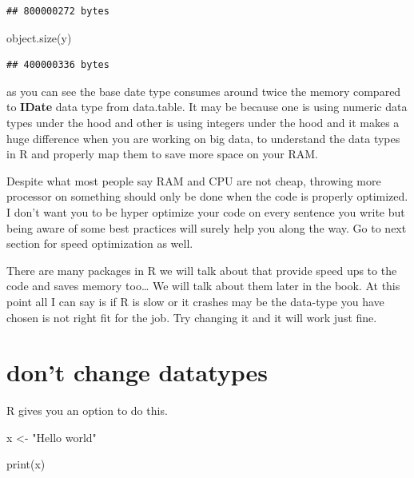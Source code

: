 \documentclass[
]{book}
\newenvironment{Shaded}{\begin{snugshade}}{\end{snugshade}}
\newcommand{\FunctionTok}[1]{\textcolor[rgb]{0.00,0.00,0.00}{#1}}
\newcommand{\NormalTok}[1]{#1}
\newcommand{\OtherTok}[1]{\textcolor[rgb]{0.56,0.35,0.01}{#1}}
\newcommand{\StringTok}[1]{\textcolor[rgb]{0.31,0.60,0.02}{#1}}
\begin{document}
\begin{verbatim}
## 800000272 bytes
\end{verbatim}

\begin{Shaded}
\begin{Highlighting}[]
\FunctionTok{object.size}\NormalTok{(y)}
\end{Highlighting}
\end{Shaded}

\begin{verbatim}
## 400000336 bytes
\end{verbatim}

as you can see the base date type consumes around twice the memory compared to \textbf{IDate} data type from data.table. It may be because one is using numeric data types under the hood and other is using integers under the hood and it makes a huge difference when you are working on big data, to understand the data types in R and properly map them to save more space on your RAM.

Despite what most people say RAM and CPU are not cheap, throwing more processor on something should only be done when the code is properly optimized. I don't want you to be hyper optimize your code on every sentence you write but being aware of some best practices will surely help you along the way. Go to next section for speed optimization as well.

There are many packages in R we will talk about that provide speed ups to the code and saves memory too\ldots{} We will talk about them later in the book. At this point all I can say is if R is slow or it crashes may be the data-type you have chosen is not right fit for the job. Try changing it and it will work just fine.

\hypertarget{dont-change-datatypes}{%
\section{don't change datatypes}\label{dont-change-datatypes}}

R gives you an option to do this.

\begin{Shaded}
\begin{Highlighting}[]
\NormalTok{x }\OtherTok{\textless{}{-}} \StringTok{"Hello world"}

\FunctionTok{print}\NormalTok{(x)}
\end{Highlighting}
\end{Shaded}
\end{document}
